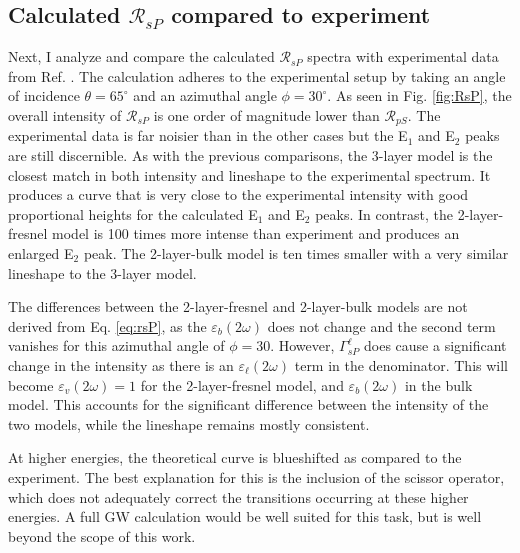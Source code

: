 
\subsection{Calculated \texorpdfstring{$\mathcal{R}_{sP}$}{RsP} compared to 
experiment}\label{sec:1x1RsP}

Next, I analyze and compare the calculated $\mathcal{R}_{sP}$ spectra with
experimental data from Ref. \cite{mejiaPRB02}. The calculation adheres to the
experimental setup by taking an angle of incidence $\theta=65^{\circ}$ and an
azimuthal angle $\phi=30^\circ$. As seen in Fig. \ref{fig:RsP}, the overall
intensity of $\mathcal{R}_{sP}$ is one order of magnitude lower than
$\mathcal{R}_{pS}$. The experimental data is far noisier than in the other cases
but the E$_{1}$ and E$_{2}$ peaks are still discernible. As with the previous
comparisons, the 3-layer model is the closest match in both intensity and
lineshape to the experimental spectrum. It produces a curve that is very close
to the experimental intensity with good proportional heights for the calculated
E$_{1}$ and E$_{2}$ peaks. In contrast, the 2-layer-fresnel model is 100 times
more intense than experiment and produces an enlarged E$_{2}$ peak. The
2-layer-bulk model is ten times smaller with a very similar lineshape to the
3-layer model.

The differences between the 2-layer-fresnel and 2-layer-bulk models are not
derived from Eq. \eqref{eq:rsP}, as the $\varepsilon_{b}(2\omega)$ does not
change and the second term vanishes for this azimuthal angle of $\phi = 30$.
However, $\Gamma^{\ell}_{sP}$ does cause a significant change in the intensity
as there is an $\varepsilon_{\ell}(2\omega)$ term in the denominator. This will
become $\varepsilon_{v}(2\omega) = 1$ for the 2-layer-fresnel model, and
$\varepsilon_{b}(2\omega)$ in the bulk model. This accounts for the significant
difference between the intensity of the two models, while the lineshape remains
mostly consistent.

At higher energies, the theoretical curve is blueshifted as compared to the
experiment. The best explanation for this is the inclusion of the scissor
operator, which does not adequately correct the transitions occurring at these
higher energies. A full GW calculation would be well suited for this task, but
is well beyond the scope of this work.

